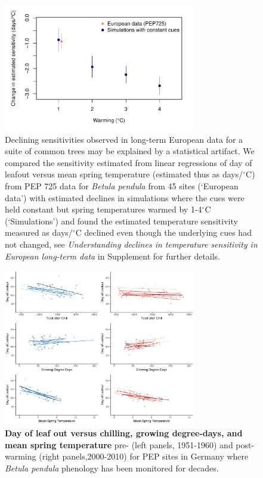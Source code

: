 \documentclass{article}
\begin{document}
\newpage
\begin{figure}[h!]
\centering
\noindent \includegraphics[width=0.75\textwidth]{..//..//analyses/bb_analysis/PEP_climate/figures/peprealandsims.pdf}
\caption{Declining sensitivities observed in long-term European data for a suite of common trees may be explained by a statistical artifact. We compared the sensitivity estimated from linear regressions of day of leafout versus mean spring temperature (estimated thus as days/$^{\circ}$C) from PEP 725 data for \emph{Betula pendula} from 45 sites (`European data') with estimated declines in simulations where the cues were held constant but spring temperatures warmed by 1-4$^{\circ}$C (`Simulations') and found the estimated temperature sensitivity measured as days/$^{\circ}$C declined even though the underlying cues had not changed, see \emph{Understanding declines in temperature sensitivity in European long-term data} in Supplement for further details.}
\label{fig:pepsims}
\end{figure}

\newpage
\begin{figure}[h!]
\centering
\noindent \includegraphics[width=0.75\textwidth]{..//..//analyses/bb_analysis/PEP_climate/figures/betpen_multruns_utahgddmat.pdf}
\caption{\textbf{Day of leaf out versus chilling, growing degree-days, and mean spring temperature} pre- (left panels, 1951-1960) and post- warming (right panels,2000-2010) for PEP sites in Germany where \emph{Betula pendula} phenology has been monitored for decades.}
\label{fig:pep}
\end{figure}
\end{document}

